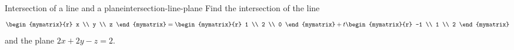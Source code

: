 \begin{example}{Intersection of a line and a plane}{intersection-line-plane}
  Find the intersection of the line
  \begin{equation*}
    \begin{mymatrix}{r} x \\ y \\ z \end{mymatrix}
    = \begin{mymatrix}{r} 1 \\ 2 \\ 0 \end{mymatrix}
    + t \begin{mymatrix}{r} -1 \\ 1 \\ 2 \end{mymatrix}
  \end{equation*}
  and the plane $2x+2y-z = 2$.%
\end{example}


